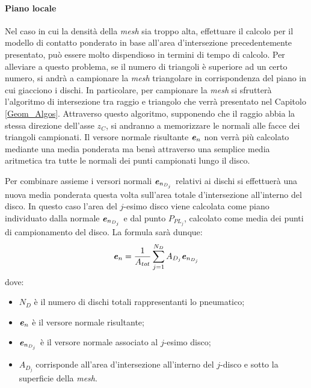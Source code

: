 \paragraph{Piano locale}
Nel caso in cui la densità della \textit{mesh} sia troppo alta, effettuare il calcolo per il modello di contatto ponderato in base all'area d'intersezione precedentemente presentato, può essere molto dispendioso in termini di tempo di calcolo. Per alleviare a questo problema, se il numero di triangoli è superiore ad un certo numero, si andrà a campionare la \textit{mesh} triangolare in corrispondenza del piano in cui giacciono i dischi. In particolare, per campionare la \textit{mesh} si sfrutterà l'algoritmo di intersezione tra raggio e triangolo che verrà presentato nel Capitolo \ref{Geom_Algos}. Attraverso questo algoritmo, supponendo che il raggio abbia la stessa direzione dell'asse $z_C$, si andranno a memorizzare le normali alle facce dei triangoli campionati. Il versore normale risultante $\textbf{\textit{e}}_n$ non verrà più calcolato mediante una media ponderata ma bensì attraverso una semplice media aritmetica tra tutte le normali dei punti campionati lungo il disco.

Per combinare assieme i versori normali $\textbf{\textit{e}}_{n_{D_j}}$ relativi ai dischi si effettuerà una nuova media ponderata questa volta sull'area totale d'intersezione all'interno del disco. In questo caso l'area del $j$-esimo disco viene calcolata come piano individuato dalla normale $\textbf{\textit{e}}_{n_{D_j}}$ e dal punto $P_{PL_j}$, calcolato come media dei punti di campionamento del disco. La formula sarà dunque:
%
\begin{equation}
\textbf{\textit{e}}_n = \frac{1}{A_{tot}}\sum_{j=1}^{N_D}A_{D_j}\textbf{\textit{e}}_{n_{D_j}}
\end{equation}
%
dove:
\begin{itemize}
	\item $N_D$ è il numero di dischi totali rappresentanti lo pneumatico;
	\item $\textbf{\textit{e}}_n$ è il versore normale risultante;
	\item $\textbf{\textit{e}}_{n_{D_j}}$ è il versore normale associato al $j$-esimo disco;
	\item $A_{D_j}$ corrisponde all'area d'intersezione all'interno del $j$-disco e sotto la superficie della \textit{mesh}.
\end{itemize}

